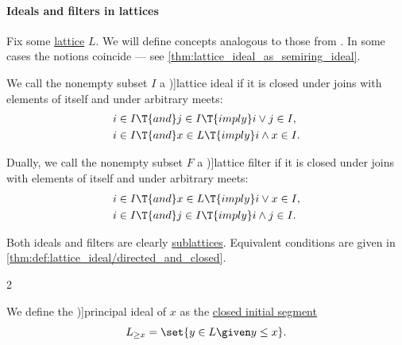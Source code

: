 \paragraph{Ideals and filters in lattices}

\begin{definition}\label{def:lattice_ideal}
  Fix some \hyperref[def:lattice]{lattice} \( L \). We will define concepts analogous to those from . In some cases the notions coincide --- see \cref{thm:lattice_ideal_as_semiring_ideal}.

  We call the nonempty subset \( I \) a \term[ru=решёточный идеал (\cite[def. 4.5]{Гуров2013ТеорияРешёток})]{lattice ideal} if it is closed under joins with elements of itself and under arbitrary meets:
  \begin{align}
    &i \in I \T{and} j \in I \T{imply} i \vee j \in I, \label{eq:def:lattice_ideal/lattice_join} \\
    &i \in I \T{and} x \in L \T{imply} i \wedge x \in I. \label{eq:def:lattice_ideal/lattice_meet}
  \end{align}

  Dually, we call the nonempty subset \( F \) a \term[ru=решёточный фильтр (\cite[def. 4.5]{Гуров2013ТеорияРешёток})]{lattice filter} if it is closed under joins with elements of itself and under arbitrary meets:
  \begin{align}
    &i \in I \T{and} x \in L \T{imply} i \vee x \in I, \label{eq:def:lattice_ideal/filter_join} \\
    &i \in I \T{and} j \in I \T{imply} i \wedge j \in I. \label{eq:def:lattice_ideal/filter_meet}
  \end{align}

  Both ideals and filters are clearly \hyperref[def:lattice/subobject]{sublattices}. Equivalent conditions are given in \cref{thm:def:lattice_ideal/directed_and_closed}.

  \begin{thmenum}
    \begin{paracol}{2}
      \begin{leftcolumn}
        We define the \term[ru=главный (идеал) (\cite[140]{Гуров2013ТеорияРешёток})]{principal ideal} of \( x \) as the \hyperref[def:order_interval/unbounded]{closed initial segment}
        \begin{equation*}
          L_{\geq x} = \set{ y \in L \given y \leq x }.
        \end{equation*}
      \end{leftcolumn}


\end{paracol}
\end{thmenum}
\end{definition}
